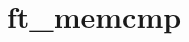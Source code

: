 \chapter{ft\+\_\+memcmp}
\hypertarget{md_Documentation_2ft__memcmp}{}\label{md_Documentation_2ft__memcmp}
